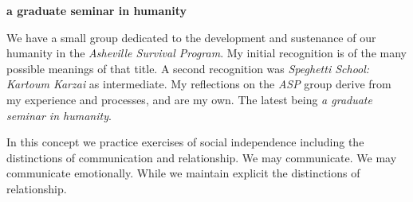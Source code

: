 

{\bf a graduate seminar in humanity}

\bigskip

We have a small group dedicated to the development and sustenance of
our humanity in the {\it Asheville Survival Program}.  My initial
recognition is of the many possible meanings of that title.  A second
recognition was {\it Speghetti School: Kartoum Karzai} as
intermediate.  My reflections on the {\it ASP} group derive from my
experience and processes, and are my own.  The latest being {\it a
graduate seminar in humanity}.

In this concept we practice exercises of social independence including
the distinctions of communication and relationship.  We may
communicate.  We may communicate emotionally.  While we maintain
explicit the distinctions of relationship.  

\bye
